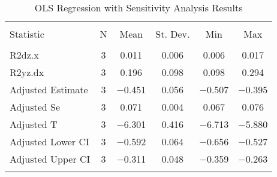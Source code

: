 
\begin{table}[!htbp] \centering 
  \caption{OLS Regression with Sensitivity Analysis Results} 
  \label{} 
\begin{tabular}{@{\extracolsep{5pt}}lccccc} 
\\[-1.8ex]\hline 
\hline \\[-1.8ex] 
Statistic & \multicolumn{1}{c}{N} & \multicolumn{1}{c}{Mean} & \multicolumn{1}{c}{St. Dev.} & \multicolumn{1}{c}{Min} & \multicolumn{1}{c}{Max} \\ 
\hline \\[-1.8ex] 
R2dz.x & 3 & 0.011 & 0.006 & 0.006 & 0.017 \\ 
R2yz.dx & 3 & 0.196 & 0.098 & 0.098 & 0.294 \\ 
Adjusted Estimate & 3 & $-$0.451 & 0.056 & $-$0.507 & $-$0.395 \\ 
Adjusted Se & 3 & 0.071 & 0.004 & 0.067 & 0.076 \\ 
Adjusted T & 3 & $-$6.301 & 0.416 & $-$6.713 & $-$5.880 \\ 
Adjusted Lower CI & 3 & $-$0.592 & 0.064 & $-$0.656 & $-$0.527 \\ 
Adjusted Upper CI & 3 & $-$0.311 & 0.048 & $-$0.359 & $-$0.263 \\ 
\hline \\[-1.8ex] 
\end{tabular} 
\end{table} 
